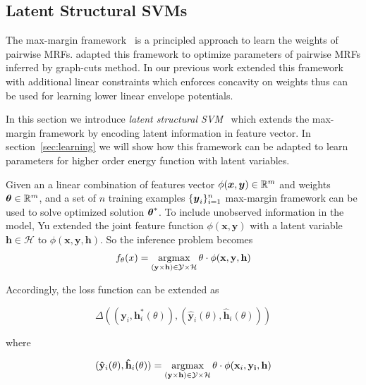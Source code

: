 \documentclass[sigconf, anonymous, review]{acmart}
\renewcommand{\citename}{\citet}
\renewcommand{\cite}{\citep}
\begin{document}
\subsection{Latent Structural SVMs}
\label{sec:latent-struct-svms}

The max-margin
framework~\cite{Taskar:ICML05,tsochantaridis2005large} is a
principled approach to learn the weights of pairwise MRFs.
\citename{Szummer:ECCV08} adapted this framework to optimize
parameters of pairwise MRFs inferred by graph-cuts method. In our
previous work \citename{gouldlearning} extended this framework
with additional linear constraints which enforces concavity on
weights thus can be used for learning lower linear envelope
potentials.

In this section we introduce \emph{latent structural
  SVM}~\cite{yu2009learning} which extends the max-margin
framework by encoding latent information in feature vector. In
section~\ref{sec:learning} we will show how this framework can be
adapted to learn parameters for higher order energy function with
latent variables.

Given an a linear combination of features vector $\phi({\boldsymbol{x}} ,{\boldsymbol{y}})
\in \mathbb{R}^m$ and weights $\boldsymbol{\theta} \in \mathbb{R}^m$, and a set of
$n$ training examples $\{{\boldsymbol{y}}_i\}_{i=1}^n$ max-margin framework
can be used to solve optimized solution $\boldsymbol{\theta}^*$. To include
unobserved information in the model, Yu\cite{yu2009learning}
extended the joint feature function\cite{tsochantaridis2005large}
$\phi(\mathbf{x},\mathbf{y}) $ with a latent variable
$\mathbf{h}\in \mathcal{H}$ to
$\phi(\mathbf{x},\mathbf{y},\mathbf{h}) $. So the inference
problem becomes
\begin{align}
  \label{eq:latent_ssvm_linearcomb}
  f_\theta(x) = \mathop{\textrm{argmax}}_{(\mathbf{y} \times \mathbf{h}) \in \mathcal{Y}
  \times \mathcal{H}} \theta\cdot\phi(\mathbf{x},\mathbf{y},\mathbf{h})
\end{align}

Accordingly, the loss function can be extended as

$$
\Delta((\mathbf{y}_i,\mathbf{h}^*_i(\theta)),(\mathbf{\hat{y}}_i(\theta),\mathbf{\hat{h}}_i(\theta)))
$$

\noindent where

\begin{align}
  \label{eq:latentssvm_full_inf}
 (\mathbf{\hat{y}}_i(\theta),\mathbf{\hat{h}}_i(\theta))=\mathop{\textrm{argmax}}_{(\mathbf{y}
  \times \mathbf{h}) \in \mathcal{Y} \times \mathcal{H}}
\theta\cdot\phi(\mathbf{x}_i,\mathbf{y_i},\mathbf{h})
\end{align}
\end{document}
